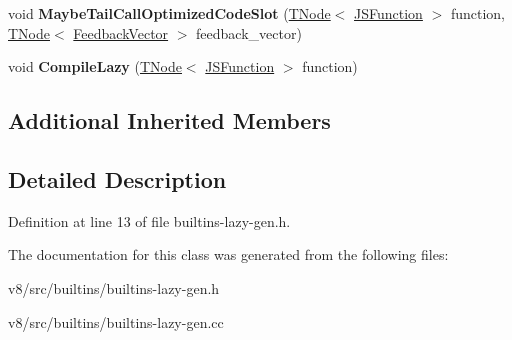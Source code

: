 \begin{DoxyCompactItemize}
void {\bfseries Maybe\+Tail\+Call\+Optimized\+Code\+Slot} (\mbox{\hyperlink{classv8_1_1internal_1_1compiler_1_1TNode}{T\+Node}}$<$ \mbox{\hyperlink{classv8_1_1internal_1_1JSFunction}{J\+S\+Function}} $>$ function, \mbox{\hyperlink{classv8_1_1internal_1_1compiler_1_1TNode}{T\+Node}}$<$ \mbox{\hyperlink{classv8_1_1internal_1_1FeedbackVector}{Feedback\+Vector}} $>$ feedback\+\_\+vector)
\item 
\mbox{\label{classv8_1_1internal_1_1LazyBuiltinsAssembler_aa55786193d7d430246a6ddc2f67fe28f}} 
void {\bfseries Compile\+Lazy} (\mbox{\hyperlink{classv8_1_1internal_1_1compiler_1_1TNode}{T\+Node}}$<$ \mbox{\hyperlink{classv8_1_1internal_1_1JSFunction}{J\+S\+Function}} $>$ function)
\end{DoxyCompactItemize}
\subsection*{Additional Inherited Members}


\subsection{Detailed Description}


Definition at line 13 of file builtins-\/lazy-\/gen.\+h.



The documentation for this class was generated from the following files\+:\begin{DoxyCompactItemize}
\item 
v8/src/builtins/builtins-\/lazy-\/gen.\+h\item 
v8/src/builtins/builtins-\/lazy-\/gen.\+cc\end{DoxyCompactItemize}
